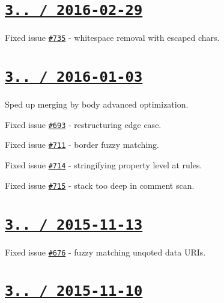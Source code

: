 \section*{\href{https://github.com/jakubpawlowicz/clean-css/compare/v3.4.9...v3.4.10}{\tt 3.. / 2016-\/02-\/29} }


\begin{DoxyItemize}
\item Fixed issue \href{https://github.com/jakubpawlowicz/clean-css/issues/735}{\tt \#735} -\/ whitespace removal with escaped chars.
\end{DoxyItemize}

\section*{\href{https://github.com/jakubpawlowicz/clean-css/compare/v3.4.8...v3.4.9}{\tt 3.. / 2016-\/01-\/03} }


\begin{DoxyItemize}
\item Sped up merging by body advanced optimization.
\item Fixed issue \href{https://github.com/jakubpawlowicz/clean-css/issues/693}{\tt \#693} -\/ restructuring edge case.
\item Fixed issue \href{https://github.com/jakubpawlowicz/clean-css/issues/711}{\tt \#711} -\/ border fuzzy matching.
\item Fixed issue \href{https://github.com/jakubpawlowicz/clean-css/issues/714}{\tt \#714} -\/ stringifying property level at rules.
\item Fixed issue \href{https://github.com/jakubpawlowicz/clean-css/issues/715}{\tt \#715} -\/ stack too deep in comment scan.
\end{DoxyItemize}

\section*{\href{https://github.com/jakubpawlowicz/clean-css/compare/v3.4.7...v3.4.8}{\tt 3.. / 2015-\/11-\/13} }


\begin{DoxyItemize}
\item Fixed issue \href{https://github.com/jakubpawlowicz/clean-css/issues/676}{\tt \#676} -\/ fuzzy matching unqoted data U\+R\+Is.
\end{DoxyItemize}

\section*{\href{https://github.com/jakubpawlowicz/clean-css/compare/v3.4.6...v3.4.7}{\tt 3.. / 2015-\/11-\/10} }


